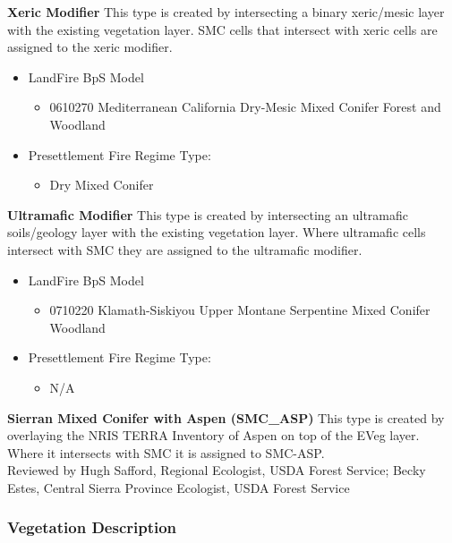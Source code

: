 \noindent \textbf{Xeric Modifier} This type is created by intersecting a binary xeric/mesic layer with the existing vegetation layer. SMC cells that intersect with xeric cells are assigned to the xeric modifier.
\begin{itemize}
	\item LandFire BpS Model
	\begin{itemize}
		\item 0610270 Mediterranean California Dry-Mesic Mixed Conifer Forest and Woodland
	\end{itemize}
		\item Presettlement Fire Regime Type: 
	\begin{itemize}
		\item Dry Mixed Conifer
	\end{itemize}
\end{itemize}

\noindent \textbf{Ultramafic Modifier} This type is created by intersecting an ultramafic soils/geology layer with the existing vegetation layer. Where ultramafic cells intersect with SMC they are assigned to the ultramafic modifier.
\begin{itemize}
	\item LandFire BpS Model
	\begin{itemize}
		\item 0710220 Klamath-Siskiyou Upper Montane Serpentine Mixed Conifer Woodland
	\end{itemize}
	\item Presettlement Fire Regime Type: 
	\begin{itemize}
		\item N/A
	\end{itemize}
\end{itemize}

\noindent \textbf{Sierran Mixed Conifer with Aspen (SMC\_ASP)} This type is created by overlaying the NRIS TERRA Inventory of Aspen on top of the EVeg layer. Where it intersects with SMC it is assigned to SMC-ASP. \\



\noindent Reviewed by Hugh Safford, Regional Ecologist, USDA Forest Service; Becky Estes, Central Sierra Province Ecologist, USDA Forest Service


\subsubsection{Vegetation Description}

